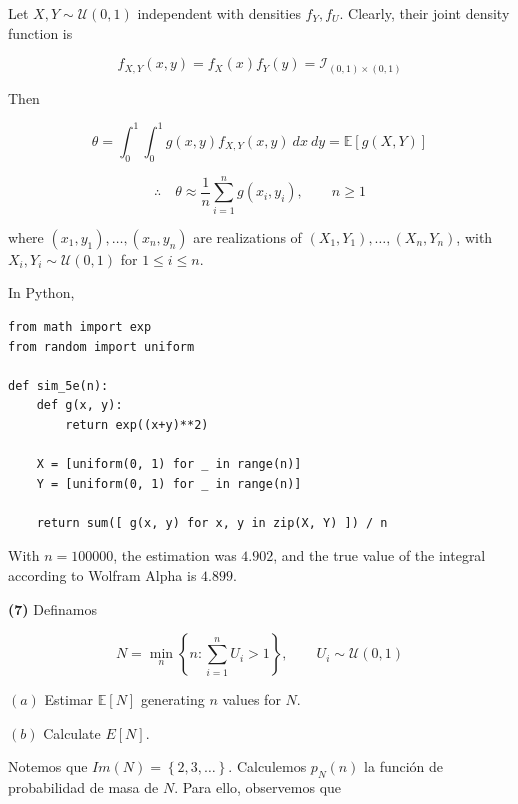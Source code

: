 \documentclass[a4paper, 12pt]{article}
\begin{document}
Let $X, Y \sim \mathcal{U}(0, 1)$ independent with densities $f_Y, f_U$. Clearly, their
joint density function is 

\begin{equation*}
  f_{X, Y}(x, y) = f_X(x)f_Y(y) = \mathcal{I}_{(0, 1) \times (0, 1)}
\end{equation*}

Then 

\begin{equation*}
  \theta = \int_0^1 \int_0^1 g(x, y) f_{X, Y}(x, y) ~ dx ~ dy = \mathbb{E}\left[
  g(X, Y)\right] 
\end{equation*}

\begin{equation*}
  \therefore \quad \theta \approx \frac{1}{n} \sum_{i=1}^{n} g(x_i, y_i), \qquad
  n \geq 1
\end{equation*}

where $(x_1, y_1), \ldots, (x_n,y_n)$ are realizations of $(X_1, Y_1),
\ldots, (X_n, Y_n)$, with $X_i, Y_i \sim \mathcal{U}(0, 1)$ for $1 \leq i \leq
n$.

In Python,

\begin{verbatim}
from math import exp 
from random import uniform 

def sim_5e(n):
    def g(x, y):
        return exp((x+y)**2)
    
    X = [uniform(0, 1) for _ in range(n)]
    Y = [uniform(0, 1) for _ in range(n)]

    return sum([ g(x, y) for x, y in zip(X, Y) ]) / n
\end{verbatim}

With $n = 100000$, the estimation was $4.902$, and the true value of the
integral according to Wolfram Alpha is $4.899$.


\pagebreak 

\begin{myframe}
\textbf{(7)} Definamos 

\begin{equation*}
  N = \min_{n} \left\{ n : \sum_{i=1}^n U_i > 1 \right\}, \qquad U_i \sim
  \mathcal{U}(0, 1)
\end{equation*}

$(a)$ Estimar $\mathbb{E}[N]$ generating $n$ values for $N$.

$(b)$ Calculate $E[N]$.

\end{myframe}


Notemos que $Im(N) = \left\{ 2, 3, \ldots \right\} $. Calculemos $p_N(n)$ la
función de probabilidad de masa de $N$. Para ello, observemos que 
\end{document}
